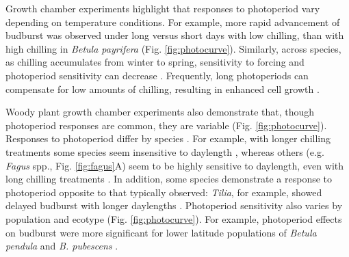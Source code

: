 \documentclass{article}
\begin{document}
\par Growth chamber experiments highlight that responses to photoperiod vary depending on temperature conditions. For example, more rapid advancement of budburst was observed under long versus short days with low chilling, than with high chilling in \emph{Betula payrifera} \citep{Hawkins:2012} (Fig. \ref{fig:photocurve}). %
Similarly, across species, as chilling accumulates from winter to spring, sensitivity to forcing and photoperiod sensitivity can decrease \citep{malyshev2018}.
Frequently, long photoperiods can compensate for low amounts of chilling, resulting in enhanced cell growth \citep{Heide:1993,Myking:1995,Caffarra:2011b}.%
\par Woody plant growth chamber experiments also demonstrate that, though photoperiod responses are common, they are variable (Fig. \ref{fig:photocurve}). Responses to photoperiod differ by species \citep[e.g.,][]{Basler:2012, Basler:2014aa,flynn2018,Heide:1993a,Howe:1996,zohner2016}.
For example, with longer chilling treatments some species seem insensitive to daylength \citep[e.g., \emph{Hammamelis} spp., \emph{Prunus} spp.,][]{zohner2016}, %
whereas others (e.g. \emph{Fagus} spp., Fig. \ref{fig:fagus}A) seem to be highly sensitive to daylength, even with long chilling treatments \citep{zohner2016}. In addition, some species demonstrate a response to photoperiod opposite to that typically observed: \emph{Tilia}, for example, showed delayed budburst with longer daylengths \citep[Fig. \ref{fig:photocurve},][]{Ashby:1962aa}. %
Photoperiod sensitivity also varies by population and ecotype \citep[e.g.,][]{Partanen:2005aa} (Fig. \ref{fig:photocurve}). For example, photoperiod effects on budburst were more significant for lower latitude populations of \emph{Betula pendula} and \emph{B. pubescens} \citep{Partanen:2005aa}. 
\end{document}
